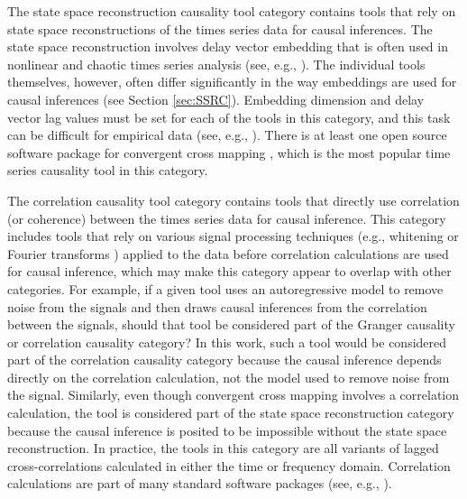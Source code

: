 \documentclass{article}[10pt]
\begin{document}
The state space reconstruction causality tool category contains tools that rely on state space reconstructions of the times series data \cite{Packard1980,ITbook_placeholder,Sauer1991} for causal inferences.  The state space reconstruction involves delay vector embedding that is often used in nonlinear and chaotic times series analysis (see, e.g., \cite{Farmer1987,Casdagli1991}).  The individual tools themselves, however, often differ significantly in the way embeddings are used for causal inferences (see Section \ref{sec:SSRC}).  Embedding dimension and delay vector lag values must be set for each of the tools in this category, and this task can be difficult for empirical data (see, e.g., \cite{Hong2006,Ataei2003,Small2004,Kennel1992}).  There is at least one open source software package for convergent cross mapping \cite{Maher2015}, which is the most popular time series causality tool in this category.

The correlation causality tool category contains tools that directly use correlation (or coherence) between the times series data for causal inference.  This category includes tools that rely on various signal processing techniques (e.g., whitening \cite{Mcnames2007,Box2013} or Fourier transforms \cite{Box2013}) applied to the data before correlation calculations are used for causal inference, which may make this category appear to overlap with other categories.  For example, if a given tool uses an autoregressive model to remove noise from the signals and then draws causal inferences from the correlation between the signals, should that tool be considered part of the Granger causality or correlation causality category?  In this work, such a tool would be considered part of the correlation causality category because the causal inference depends directly on the correlation calculation, not the model used to remove noise from the signal.  Similarly, even though convergent cross mapping involves a correlation calculation, the tool is considered part of the state space reconstruction category because the causal inference is posited to be impossible without the state space reconstruction.  In practice, the tools in this category are all variants of lagged cross-correlations calculated in either the time or frequency domain.  Correlation calculations are part of many standard software packages (see, e.g., \cite{R2012,MATLAB2007,Octave2013}).
\end{document}
